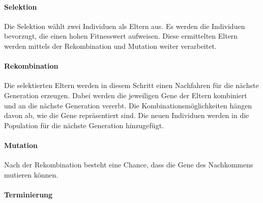 \paragraph*{Selektion}
Die Selektion w{\"a}hlt zwei Individuen als Eltern aus.
Es werden die Individuen bevorzugt, die einen hohen Fitnesswert aufweisen. Diese ermittelten Eltern werden mittels der Rekombination und Mutation weiter verarbeitet.

\paragraph*{Rekombination}
Die selektierten Eltern werden in diesem Schritt einen Nachfahren f{\"u}r die n{\"a}chste Generation erzeugen. Dabei werden die jeweiligen Gene der Eltern kombiniert und an die n{\"a}chste Generation vererbt. Die Kombinationsm{\"o}glichkeiten h{\"a}ngen davon ab, wie die Gene repr{\"a}sentiert sind.
Die neuen Individuen werden in die Population f{\"u}r die n{\"a}chste Generation hinzugef{\"u}gt.


\paragraph*{Mutation}
Nach der Rekombination besteht eine Chance, dass die Gene des Nachkommens mutieren k{\"o}nnen. 

\paragraph*{Terminierung}

